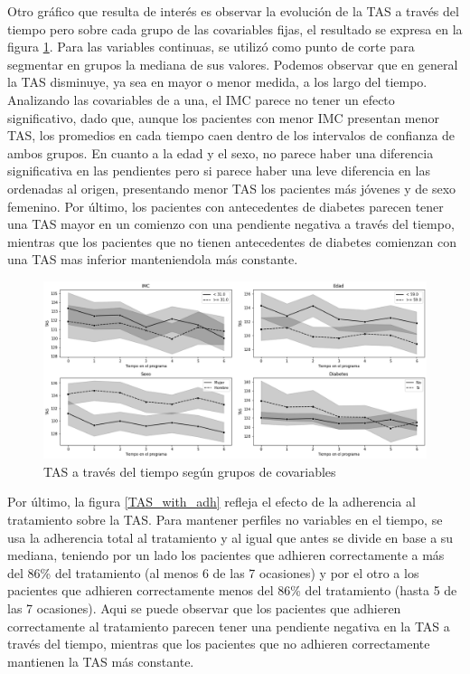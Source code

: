 \documentclass[spanish]{article}
\numberwithin{figure}{subsection}
\numberwithin{equation}{subsection}
\numberwithin{table}{subsection}
\begin{document}
Otro gráfico que resulta de interés es observar la evolución de la TAS a través
del tiempo pero sobre cada grupo de las covariables fijas, el resultado se
expresa en la figura \ref{TAS_with_covs}. Para las variables continuas, se
utilizó como punto de corte para segmentar en grupos la mediana de sus valores.
Podemos observar que en general la TAS disminuye, ya sea en mayor o menor
medida, a los largo del tiempo. Analizando las covariables de a una, el IMC
parece no tener un efecto significativo, dado que, aunque los pacientes con
menor IMC presentan menor TAS, los promedios en cada tiempo caen dentro de los
intervalos de confianza de ambos grupos. En cuanto a la edad y el sexo, no
parece haber una diferencia significativa en las pendientes pero si parece haber
una leve diferencia en las ordenadas al origen, presentando menor TAS los
pacientes más jóvenes y de sexo femenino. Por último, los pacientes con
antecedentes de diabetes parecen tener una TAS mayor en un comienzo con una
pendiente negativa a través del tiempo, mientras que los pacientes que no tienen
antecedentes de diabetes comienzan con una TAS mas inferior manteniendola más
constante.

\begin{figure}[H]
	\centering
	\includegraphics[scale=0.4]{img/TAS_vs_tpo_with_covs.png}
	\caption{TAS a través del tiempo según grupos de covariables}
	\label{TAS_with_covs}
\end{figure}

Por último, la figura \ref{TAS_with_adh} refleja el efecto de la adherencia al
tratamiento sobre la TAS. Para mantener perfiles no variables en el tiempo, se
usa la adherencia total al tratamiento y al igual que antes se divide en base a
su mediana, teniendo por un lado los pacientes que adhieren correctamente a más
del 86\% del tratamiento (al menos 6 de las 7 ocasiones) y por el otro a los
pacientes que adhieren correctamente menos del 86\% del tratamiento (hasta 5 de
las 7 ocasiones). Aqui se puede observar que los pacientes que adhieren
correctamente al tratamiento parecen tener una pendiente negativa en la TAS a
través del tiempo, mientras que los pacientes que no adhieren correctamente
mantienen la TAS más constante.
\end{document}
